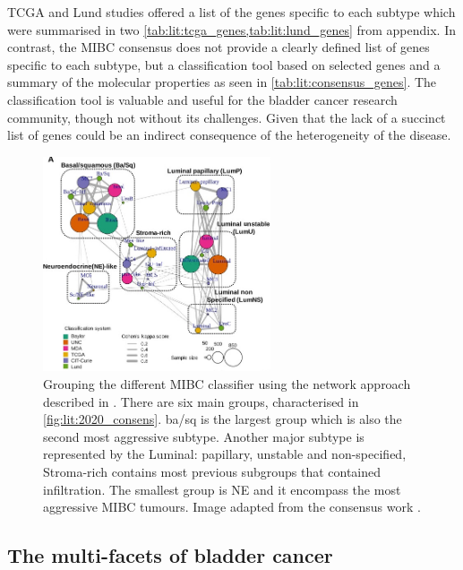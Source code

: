 TCGA and Lund studies offered a list of the genes specific to each subtype which were summarised in two \cref{tab:lit:tcga_genes,tab:lit:lund_genes} from appendix. In contrast, the MIBC consensus does not provide a clearly defined list of genes specific to each subtype, but a classification tool based on selected genes and a summary of the molecular properties as seen in \cref{tab:lit:consensus_genes}. The classification tool is valuable and useful for the bladder cancer research community, though not without its challenges. Given that the lack of a succinct list of genes could be an indirect consequence of the heterogeneity of the disease.


\begin{figure}[!htb]    
    \centering
\includegraphics[width=0.6\textwidth,height=0.6\textheight,keepaspectratio]{Sections/Lit_review/Resources/consensus_network_classifier.jpg}
    \caption[Network of the datasets involved in the MIBC consensus subgroups]{Grouping the different MIBC classifier using the network approach described in \cite{Guinney2015-fy}. There are six main groups, characterised in \cref{fig:lit:2020_consens}. \acrfull{ba/sq} is the largest group which is also the second most aggressive subtype. Another major subtype is represented by the Luminal: papillary, unstable and non-specified, Stroma-rich contains most previous subgroups that contained infiltration. The smallest group is \gls{NE} and it encompass the most aggressive MIBC tumours. Image adapted from the consensus work \citet{Kamoun2020-tj}.}
    \label{fig:lit:consensus_network}
\end{figure}




\subsection{The multi-facets of bladder cancer} \label{s:lit:bladder_other}

